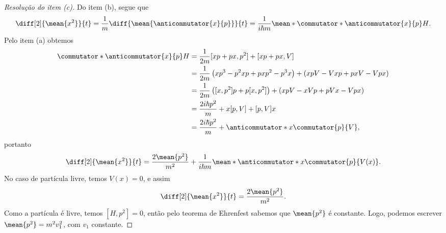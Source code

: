 \begin{proof}[Resolução do item (c)]
    Do item (b), segue que
    \begin{equation*}
        \diff[2]{\mean{x^2}}{t} = \frac{1}{m} \diff{\mean{\anticommutator{x}{p}}}{t} = \frac{1}{i \hbar m} \mean*{\commutator*{\anticommutator{x}{p}}{H}}. %
    \end{equation*}
    Pelo item (a) obtemos
    \begin{align*}
        \commutator*{\anticommutator{x}{p}}{H} &= \frac1{2m}[xp + px, p^2] + [xp + px, V]\\
                                               &= \frac{1}{2m}\left(xp^3 - p^2xp + pxp^2 - p^3x\right) + \left(xpV - Vxp + pxV - Vpx\right)\\
                                               &= \frac{1}{2m}\left([x,p^2]p + p[x,p^2]\right) + \left(xpV - xVp + pVx - Vp x\right)\\
                                               &= \frac{2 i\hbar p^2}{m} + x[p, V] + [p, V]x\\
                                               &= \frac{2i \hbar p^2}{m} + \anticommutator*{x}{\commutator{p}{V}},
    \end{align*}
    portanto
    \begin{equation*}
        \diff[2]{\mean{x^2}}{t} = \frac{2\mean{p^2}}{m^2} + \frac{1}{i\hbar m} \mean*{\anticommutator*{x}{\commutator{p}{V(x)}}}.
    \end{equation*}
    No caso de partícula livre, temos \(V(x) = 0\), e assim
    \begin{equation*}
        \diff[2]{\mean{x^2}}{t} = \frac{2\mean{p^2}}{m^2}.
    \end{equation*}
    Como a partícula é livre, temos \([H, p^2] = 0\), então pelo teorema de Ehrenfest sabemos que \(\mean{p^2}\) é constante. Logo, podemos escrever \(\mean{p^2} = m^2 v_1^2\), com \(v_1\) constante.
\end{proof}
